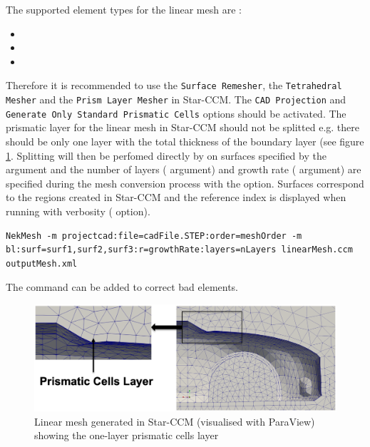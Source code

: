 The supported element types for the linear mesh are :
\begin{itemize}
  \item {}
  \item {}
  \item {}
\end{itemize}

Therefore it is recommended to use the \texttt{Surface Remesher}, the \texttt{Tetrahedral Mesher} and the \texttt{Prism Layer Mesher} in Star-CCM. The \texttt{CAD Projection} and \texttt{Generate Only Standard Prismatic Cells} options should be activated. 
The prismatic layer for the linear mesh in Star-CCM should not be splitted e.g. there should be only one layer with the total thickness of the boundary layer (see figure \ref{fig:util:mc:Car_mesh}. Splitting will then be perfomed directly by \nm on surfaces specified by the argument  and the number of layers ( argument) and growth rate ( argument) are specified during the mesh conversion process with the  option. Surfaces correspond to the regions created in Star-CCM and the reference index is displayed when running \nm with verbosity ( option).

\begin{lstlisting}[style=BashInputStyle]
  NekMesh -m projectcad:file=cadFile.STEP:order=meshOrder -m bl:surf=surf1,surf2,surf3:r=growthRate:layers=nLayers linearMesh.ccm outputMesh.xml
\end{lstlisting}

The command  can be added to correct bad elements.

\begin{figure}
  \begin{center}
    \includegraphics[width=1.0\textwidth]{img/Car_mesh.png}
  \end{center}
  \caption{Linear mesh generated in Star-CCM (visualised with ParaView) showing the one-layer prismatic cells layer}
  \label{fig:util:mc:Car_mesh}
\end{figure}
